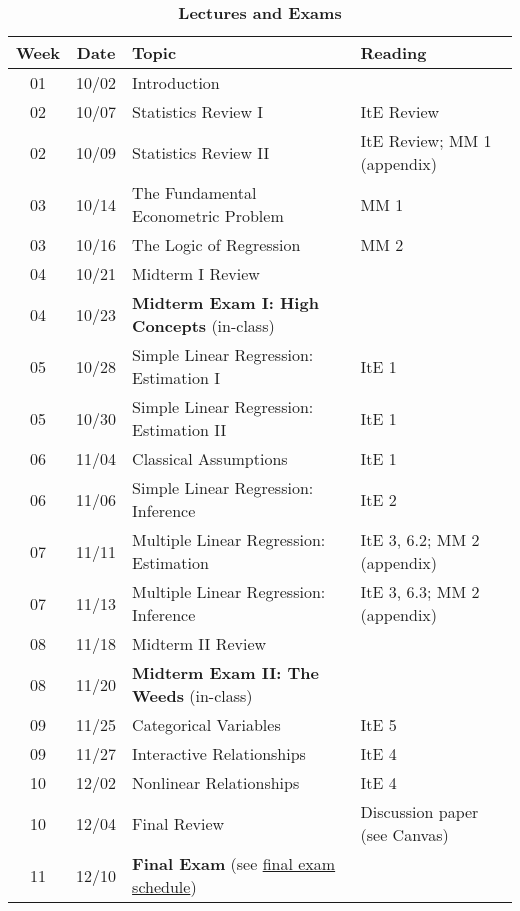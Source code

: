 \documentclass[10pt]{article}
\newcommand{\ra}[1]{\renewcommand{\arraystretch}{#1}}
\begin{document}
\begin{table}[H]
	\caption*{\large\textbf{Lectures and Exams}}
	\centering
  \ra{1.5}
  \begin{tabular}{@{\extracolsep{0.5cm}} c c l l @{}}
    \toprule
    \textbf{Week} & \textbf{Date} & \textbf{Topic} & \textbf{Reading}  \\ \toprule
    01 & 10/02 & Introduction & \\
    02 & 10/07 & Statistics Review I & ItE Review \\
    02 & 10/09 & Statistics Review II & ItE Review; MM 1 (appendix) \\
    03 & 10/14 & The Fundamental Econometric Problem & MM 1 \\
    03 & 10/16 & The Logic of Regression & MM 2  \\
    04 & 10/21 & Midterm I Review & \\ \midrule
    04 & 10/23 & \textbf{Midterm Exam I: High Concepts} (in-class) \\ \midrule
    05 & 10/28 & Simple Linear Regression: Estimation I & ItE 1  \\
    05 & 10/30 & Simple Linear Regression: Estimation II & ItE 1 \\
    06 & 11/04 & Classical Assumptions & ItE 1  \\
    06 & 11/06 & Simple Linear Regression: Inference & ItE 2 \\
    07 & 11/11 & Multiple Linear Regression: Estimation & ItE 3, 6.2; MM 2 (appendix) \\
    07 & 11/13 & Multiple Linear Regression: Inference & ItE 3, 6.3; MM 2 (appendix) \\
    08 & 11/18 & Midterm II Review &   \\ \midrule
    08 & 11/20 & \textbf{Midterm Exam II: The Weeds} (in-class) \\ \midrule
    09 & 11/25 & Categorical Variables & ItE 5  \\
    09 & 11/27 & Interactive Relationships & ItE 4  \\
    10 & 12/02 & Nonlinear Relationships & ItE 4  \\
    10 & 12/04 & Final Review &  Discussion paper (see Canvas) \\ \midrule
    11 & 12/10 & \textbf{Final Exam} (see \href{https://registrar.uoregon.edu/calendars/examinations#complete-final-exam-schedule}{final exam schedule}) \\
    \bottomrule
  \end{tabular}
\end{table}
\end{document}
